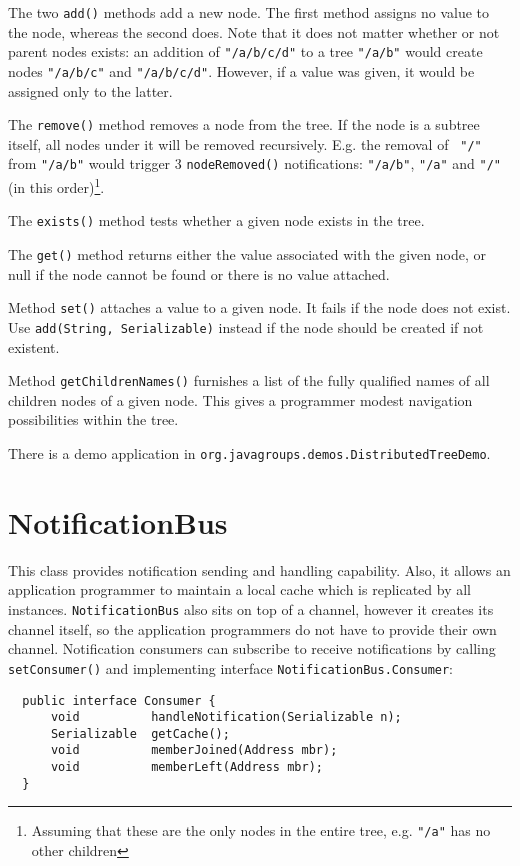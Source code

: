   The two {\tt add()} methods add a new node. The first method assigns no value to
  the node, whereas the second does. Note that it does not matter whether or not
  parent nodes exists: an addition of {\tt "/a/b/c/d"} to a tree {\tt "/a/b"} would
  create nodes {\tt "/a/b/c"} and {\tt "/a/b/c/d"}. However, if a value was given, it
  would be assigned only to the latter.

  The {\tt remove()} method removes a node from the tree. If the node is a subtree
  itself, all nodes under it will be removed recursively. E.g. the removal of {\tt
  "/"} from {\tt "/a/b"} would trigger 3 {\tt nodeRemoved()} notifications: {\tt "/a/b"},
  {\tt "/a"} and {\tt "/"} (in this order)\footnote{Assuming that these are the only
  nodes in the entire tree, e.g. {\tt "/a"} has no other children}.

  The {\tt exists()} method tests whether a given node exists in the tree.

  The {\tt get()} method returns either the value associated with the given node, or
  null if the node cannot be found or there is no value attached.

  Method {\tt set()} attaches a value to a given node. It fails if the node does not
  exist. Use {\tt add(String, Serializable)} instead if the node should be created if
  not existent.

  Method {\tt getChildrenNames()} furnishes a list of the fully qualified names of
  all children nodes of a given node. This gives a programmer modest navigation
  possibilities within the tree.

  There is a demo application in {\tt org.javagroups.demos.DistributedTreeDemo}.



  \section{NotificationBus}

  This class provides notification sending and handling capability. Also, it allows
  an application programmer to maintain a local cache which is replicated by all
  instances. {\tt NotificationBus} also sits on top of a channel, however it creates
  its channel itself, so the application programmers do not have to provide their own
  channel. Notification consumers can subscribe to receive notifications by calling
  {\tt setConsumer()} and implementing interface {\tt NotificationBus.Consumer}:

  \begin{small}
  \begin{verbatim}
  public interface Consumer {
      void          handleNotification(Serializable n);
      Serializable  getCache();
      void          memberJoined(Address mbr);
      void          memberLeft(Address mbr);
  }
  \end{verbatim}
  \end{small}

